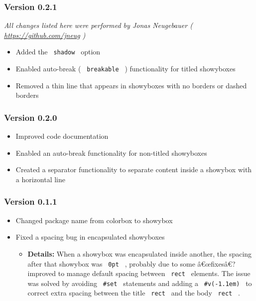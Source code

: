 \subsubsection{Version 0.2.1}\label{version-0.2.1}

\emph{All changes listed here were performed by Jonas Neugebauer (
\url{https://github.com/jneug} )}

\begin{itemize}
\tightlist
\item
  Added the \texttt{\ shadow\ } option
\item
  Enabled auto-break ( \texttt{\ breakable\ } ) functionality for titled
  showyboxes
\item
  Removed a thin line that appears in showyboxes with no borders or
  dashed borders
\end{itemize}

\subsubsection{Version 0.2.0}\label{version-0.2.0}

\begin{itemize}
\tightlist
\item
  Improved code documentation
\item
  Enabled an auto-break functionality for non-titled showyboxes
\item
  Created a separator functionality to separate content inside a
  showybox with a horizontal line
\end{itemize}

\subsubsection{Version 0.1.1}\label{version-0.1.1}

\begin{itemize}
\tightlist
\item
  Changed package name from colorbox to showybox
\item
  Fixed a spacing bug in encapsulated showyboxes

  \begin{itemize}
  \tightlist
  \item
    \textbf{Details:} When a showybox was encapsulated inside another,
    the spacing after that showybox was \texttt{\ 0pt\ } , probably due
    to some â€œfixesâ€? improved to manage default spacing between
    \texttt{\ rect\ } elements. The issue was solved by avoiding
    \texttt{\ \#set\ } statements and adding a \texttt{\ \#v(-1.1em)\ }
    to correct extra spacing between the title \texttt{\ rect\ } and the
    body \texttt{\ rect\ } .
  \end{itemize}
\end{itemize}

